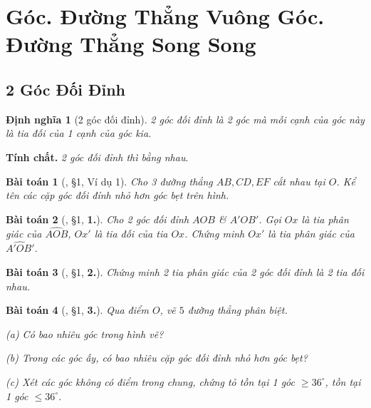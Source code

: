 \documentclass{article}
\numberwithin{equation}{section}
\newtheorem{dinhnghia}{Định nghĩa}[section]
\newtheorem{baitoan}{Bài toán}[section]
\begin{document}

\section{Góc. Đường Thẳng Vuông Góc. Đường Thẳng Song Song}

\subsection{2 Góc Đối Đỉnh}

\begin{dinhnghia}[2 góc đối đỉnh]
	\emph{2 góc đối đỉnh} là 2 góc mà mỗi cạnh của góc này là tia đối của 1 cạnh của góc kia.
\end{dinhnghia}
\textbf{Tính chất.} \textit{2 góc đối đỉnh thì bằng nhau}.

\begin{baitoan}[\cite{Binh_Toan_7_tap_1}, \S1, Ví dụ 1]
	Cho 3 đường thẳng $AB,CD,EF$ cắt nhau tại $O$. Kể tên các cặp góc đối đỉnh nhỏ hơn  góc bẹt trên hình.
\end{baitoan}

\begin{baitoan}[\cite{Binh_Toan_7_tap_1}, \S1, \textbf{1.}]
	Cho 2 góc đối đỉnh $AOB$ \& $A'OB'$. Gọi $Ox$ là tia phân giác của $\widehat{AOB}$, $Ox'$ là tia đối của tia $Ox$. Chứng minh $Ox'$ là tia phân giác của $\widehat{A'OB'}$.
\end{baitoan}

\begin{baitoan}[\cite{Binh_Toan_7_tap_1}, \S1, \textbf{2.}]
	Chứng minh 2 tia phân giác của 2 góc đối đỉnh là 2 tia đối nhau.
\end{baitoan}

\begin{baitoan}[\cite{Binh_Toan_7_tap_1}, \S1, \textbf{3.}]
	Qua điểm $O$, vẽ $5$ đường thẳng phân biệt.
	\begin{enumerate*}
		\item[(a)] Có bao nhiêu góc trong hình vẽ?
		\item[(b)] Trong các góc ấy, có bao nhiêu cặp góc đối đỉnh nhỏ hơn góc bẹt?
		\item[(c)] Xét các góc không có điểm trong chung, chứng tỏ tồn tại 1 góc $\ge36^\circ$, tồn tại 1 góc $\le36^\circ$.
	\end{enumerate*}
\end{baitoan}

\end{document}

